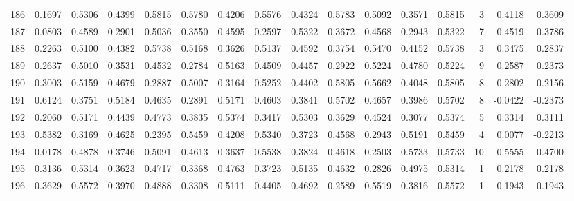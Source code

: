 \begin{tabular}{lrrrrrrrrrrrrrrr}
186 &      0.1697 &  0.5306 &  0.4399 &  0.5815 &  0.5780 &  0.4206 &  0.5576 &  0.4324 &  0.5783 &  0.5092 &   0.3571 &     0.5815 &      3 &                    0.4118 &                     0.3609 \\
187 &      0.0803 &  0.4589 &  0.2901 &  0.5036 &  0.3550 &  0.4595 &  0.2597 &  0.5322 &  0.3672 &  0.4568 &   0.2943 &     0.5322 &      7 &                    0.4519 &                     0.3786 \\
188 &      0.2263 &  0.5100 &  0.4382 &  0.5738 &  0.5168 &  0.3626 &  0.5137 &  0.4592 &  0.3754 &  0.5470 &   0.4152 &     0.5738 &      3 &                    0.3475 &                     0.2837 \\
189 &      0.2637 &  0.5010 &  0.3531 &  0.4532 &  0.2784 &  0.5163 &  0.4509 &  0.4457 &  0.2922 &  0.5224 &   0.4780 &     0.5224 &      9 &                    0.2587 &                     0.2373 \\
190 &      0.3003 &  0.5159 &  0.4679 &  0.2887 &  0.5007 &  0.3164 &  0.5252 &  0.4402 &  0.5805 &  0.5662 &   0.4048 &     0.5805 &      8 &                    0.2802 &                     0.2156 \\
191 &      0.6124 &  0.3751 &  0.5184 &  0.4635 &  0.2891 &  0.5171 &  0.4603 &  0.3841 &  0.5702 &  0.4657 &   0.3986 &     0.5702 &      8 &                   -0.0422 &                    -0.2373 \\
192 &      0.2060 &  0.5171 &  0.4439 &  0.4773 &  0.3835 &  0.5374 &  0.3417 &  0.5303 &  0.3629 &  0.4524 &   0.3077 &     0.5374 &      5 &                    0.3314 &                     0.3111 \\
193 &      0.5382 &  0.3169 &  0.4625 &  0.2395 &  0.5459 &  0.4208 &  0.5340 &  0.3723 &  0.4568 &  0.2943 &   0.5191 &     0.5459 &      4 &                    0.0077 &                    -0.2213 \\
194 &      0.0178 &  0.4878 &  0.3746 &  0.5091 &  0.4613 &  0.3637 &  0.5538 &  0.3824 &  0.4618 &  0.2503 &   0.5733 &     0.5733 &     10 &                    0.5555 &                     0.4700 \\
195 &      0.3136 &  0.5314 &  0.3623 &  0.4717 &  0.3368 &  0.4763 &  0.3723 &  0.5135 &  0.4632 &  0.2826 &   0.4975 &     0.5314 &      1 &                    0.2178 &                     0.2178 \\
196 &      0.3629 &  0.5572 &  0.3970 &  0.4888 &  0.3308 &  0.5111 &  0.4405 &  0.4692 &  0.2589 &  0.5519 &   0.3816 &     0.5572 &      1 &                    0.1943 &                     0.1943 \\

\end{tabular}
